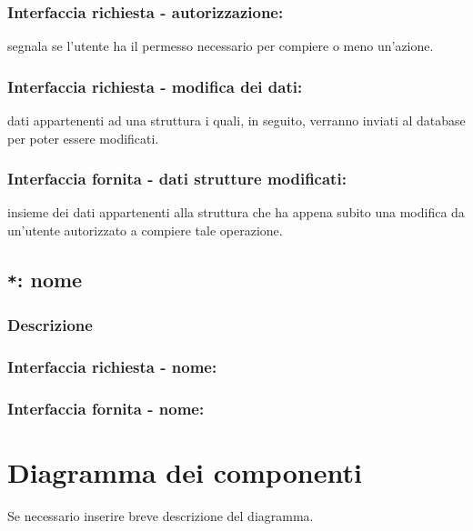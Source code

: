         \subsubsection{Interfaccia richiesta - autorizzazione:}
            segnala se l'utente ha il permesso necessario per compiere o meno un'azione.
        \subsubsection{Interfaccia richiesta - modifica dei dati:}
            dati appartenenti ad una struttura i quali, in seguito, verranno inviati al database per poter essere modificati.
        \subsubsection{Interfaccia fornita - dati strutture modificati:}
            insieme dei dati appartenenti alla struttura che ha appena subito una modifica da un'utente autorizzato a compiere tale operazione.

    \subsection{\texttt{*}: nome}
        \subsubsection{Descrizione}
        \subsubsection{Interfaccia richiesta - nome:}
        \subsubsection{Interfaccia fornita - nome:}

\section{Diagramma dei componenti}
    Se necessario inserire breve descrizione del diagramma.

